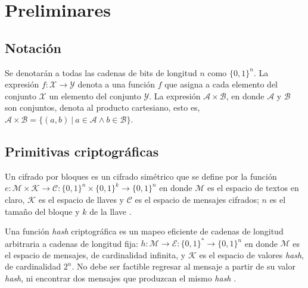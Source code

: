 %
%

\section{Preliminares}
\label{sec:preliminares}

\subsection{Notación}

Se denotarán a todas las cadenas de bits de longitud $ n $ como $ \{ 0, 1 \}^n $.
La expresión $ f: \mathcal{X} \rightarrow \mathcal{Y} $ denota a una función $ f
$ que asigna a cada elemento del conjunto $ \mathcal{X} $ un elemento del
conjunto $ \mathcal{Y} $. La expresión $ \mathcal{A} \times \mathcal{B} $, en
donde $ \mathcal{A} $ y $ \mathcal{B} $ son conjuntos, denota al producto
cartesiano, esto es, $ \mathcal{A} \times \mathcal{B} = \{ (a,b) \ | \ a \in
\mathcal{A} \land b \in \mathcal{B} \} $.

\subsection{Primitivas criptográficas}

Un cifrado por bloques es un cifrado simétrico que se define por la función $ e:
\mathcal{M} \times \mathcal{K} \rightarrow \mathcal{C} : \{ 0, 1 \}^n \times \{
0, 1 \}^k \rightarrow \{ 0, 1 \}^n $ en donde $ \mathcal{M} $ es el espacio de
textos en claro, $ \mathcal{K} $ es el espacio de llaves y $ \mathcal{C} $ es el
espacio de mensajes cifrados; $ n $ es el tamaño del bloque y $ k $ de la llave
\cite{menezes}.


Una función \textit{hash} criptográfica es un mapeo eficiente de cadenas de
longitud arbitraria a cadenas de longitud fija: $ h: \mathcal{M} \rightarrow
\mathcal{E} : \{ 0, 1 \}^* \rightarrow \{ 0, 1 \}^n $ en donde $ \mathcal{M} $
es el espacio de mensajes, de cardinalidad infinita, y $ \mathcal{K} $ es el
espacio de valores \textit{hash}, de cardinalidad $ 2^n $. No debe ser factible
regresar al mensaje a partir de su valor \textit{hash}, ni encontrar dos
mensajes que produzcan el mismo \textit{hash} \cite{menezes}.


